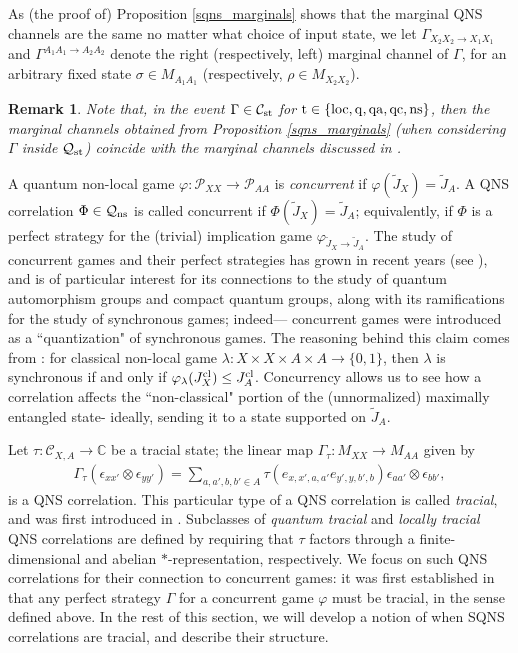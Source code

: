 \documentclass[11pt]{amsart}
\newtheorem{remark}[theorem]{Remark}
\newcommand{\cl}[1]{\mathcal{#1}}
\newcommand{\bb}[1]{\mathbb{#1}}
\begin{document}
As (the proof of) Proposition \ref{sqns_marginals} shows that the marginal QNS channels are the same no matter what choice of input state, we let $\Gamma_{X_{2}X_{2}\rightarrow X_{1}X_{1}}$ and $\Gamma^{A_{1}A_{1}\rightarrow A_{2}A_{2}}$ denote the right (respectively, left) marginal channel of $\Gamma$, for an arbitrary fixed state $\sigma \in M_{A_{1}A_{1}}$ (respectively, $\rho \in M_{X_{2}X_{2}}$). 

\begin{remark}
\rm Note that, in the event $\Gamma \in \cl{C}_{\rm st}$ for ${\rm t} \in \{\rm loc, q, qa, qc, ns\}$, then the marginal channels obtained from Proposition \ref{sqns_marginals} (when considering $\Gamma$ inside $\cl{Q}_{\rm st}$) coincide with the marginal channels discussed in \cite[Section 5]{gt_one}.
\end{remark}

A quantum non-local game $\varphi: \cl{P}_{XX}\rightarrow \cl{P}_{AA}$ is \textit{concurrent} if $\varphi(\tilde{J}_{X}) = \tilde{J}_{A}$. A QNS correlation $\Phi \in \cl{Q}_{\rm ns}$ is called concurrent if $\Phi(\tilde{J}_{X}) = \tilde{J}_{A}$; equivalently, if $\Phi$ is a perfect strategy for the (trivial) implication game $\varphi_{\tilde{J}_{X}\rightarrow \tilde{J}_{A}}$. The study of concurrent games and their perfect strategies has grown in recent years (see \cite{synch_bhtt, bhtt, tt}), and is of particular interest for its connections to the study of quantum automorphism groups and compact quantum groups, along with its ramifications for the study of synchronous games; indeed--- concurrent games were introduced as a ``quantization" of synchronous games. The reasoning behind this claim comes from \cite[Remark 2.1]{synch_bhtt}: for classical non-local game $\lambda: X\times X\times A\times A\rightarrow \{0, 1\}$, then $\lambda$ is synchronous if and only if $\varphi_{\lambda}(J_{X}^{\rm cl}) \leq J_{A}^{\rm cl}$. Concurrency allows us to see how a correlation affects the ``non-classical" portion of the (unnormalized) maximally entangled state- ideally, sending it to a state supported on $\tilde{J}_{A}$. 

Let $\tau: \cl{C}_{X, A}\rightarrow \bb{C}$ be a tracial state; the linear map $\Gamma_{\tau}: M_{XX}\rightarrow M_{AA}$ given by
\begin{gather*}
	\Gamma_{\tau}(\epsilon_{xx'}\otimes \epsilon_{yy'}) = \sum\limits_{a, a', b, b' \in A}\tau(e_{x, x', a, a'}e_{y', y, b', b})\epsilon_{aa'}\otimes \epsilon_{bb'},
\end{gather*}
\noindent is a QNS correlation. This particular type of a QNS correlation is called \textit{tracial}, and was first introduced in \cite{tt}. Subclasses of \textit{quantum tracial} and \textit{locally tracial} QNS correlations are defined by requiring that $\tau$ factors through a finite-dimensional and abelian $*$-representation, respectively. We focus on such QNS correlations for their connection to concurrent games: it was first established in \cite[Theorem 4.1]{synch_bhtt} that any perfect strategy $\Gamma$ for a concurrent game $\varphi$ must be tracial, in the sense defined above. In the rest of this section, we will develop a notion of when SQNS correlations are tracial, and describe their structure. 
\end{document}
